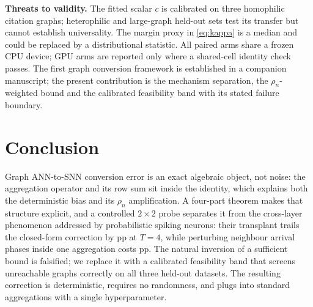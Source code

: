 \documentclass[10pt,twocolumn]{article}
\newcommand{\rhon}{\rho_n}
\begin{document}
\textbf{Threats to validity.} The fitted scalar $c$ is calibrated on three homophilic citation
graphs; heterophilic and large-graph held-out sets test its transfer but cannot establish
universality. The margin proxy in \eqref{eq:kappa} is a median and could be replaced by a
distributional statistic. All paired arms share a frozen CPU device; GPU arms are reported only
where a shared-cell identity check passes. The first graph conversion framework is established in a companion manuscript; the
present contribution is the mechanism separation, the $\rhon$-weighted bound and the
calibrated feasibility band with its stated failure boundary.

\section{Conclusion}
\label{sec:conclusion}
Graph ANN-to-SNN conversion error is an exact algebraic object, not noise: the aggregation
operator and its row sum sit inside the identity, which explains both the deterministic bias and
its $\rhon$ amplification. A four-part theorem makes that structure explicit, and a controlled
$2\times2$ probe separates it from the cross-layer phenomenon addressed by probabilistic spiking
neurons: their transplant trails the closed-form correction by \soneTppGap{} pp at $T{=}4$,
while perturbing neighbour arrival phases inside one aggregation costs \soneIntra{} pp.
The natural inversion of a sufficient bound is falsified; we replace it with a calibrated
feasibility band that screens unreachable graphs correctly on all three held-out datasets.
The resulting correction is deterministic, requires no randomness, and plugs into standard
aggregations with a single hyperparameter.




\appendix

\end{document}
